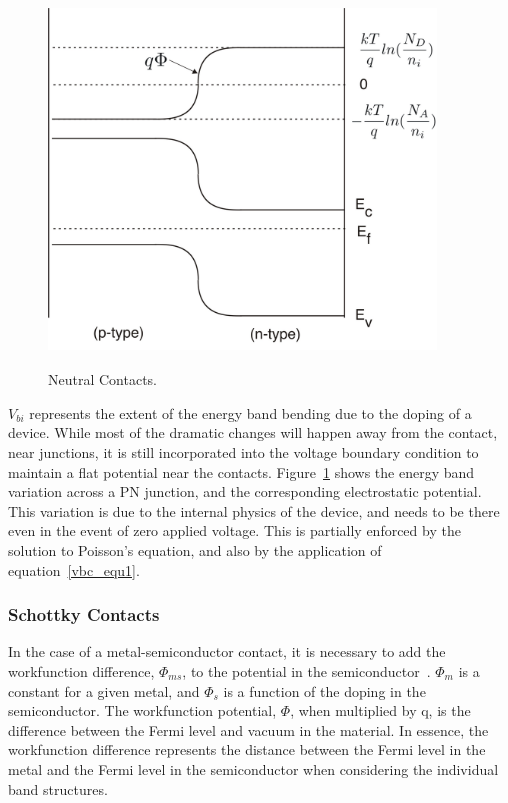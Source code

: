 \begin{figure}[ht]
  \centering
  \scalebox{1.0}
  {\includegraphics[width=4.050in,height= 3.600in]{neutral_contacts}}
  \caption[Neutral Contacts]{Neutral Contacts. \label{figNeutralContact}}
\end{figure}

$V_{bi}$ represents the extent of the energy band bending due to the doping
of a device.  While most of the dramatic changes will happen away from the
contact, near junctions, it is still incorporated into the voltage boundary
condition to maintain a flat potential near the contacts.  
Figure~\ref{figNeutralContact} shows the energy band variation across a PN
junction, and the corresponding electrostatic potential.  This variation is
due to the internal physics of the device, and needs to be there even in
the event of zero applied voltage.  This is partially enforced by the
solution to Poisson's equation, and also by the application of
equation~\ref{vbc_equ1}.


\subsubsection{Schottky Contacts}
In the case of a metal-semiconductor contact, it is necessary to add the
workfunction difference, $\Phi_{ms}$, to the potential in the
semiconductor~\cite{streetman}.  $\Phi_{m}$ is a constant for a given metal, and $\Phi_{s}$
is a function of the doping in the semiconductor.  The workfunction
potential, $\Phi$, when multiplied by q, is the difference between the
Fermi level and vacuum in the material.  In essence, the workfunction
difference represents the distance between the Fermi level in the metal and
the Fermi level in the semiconductor when considering the individual band
structures.

